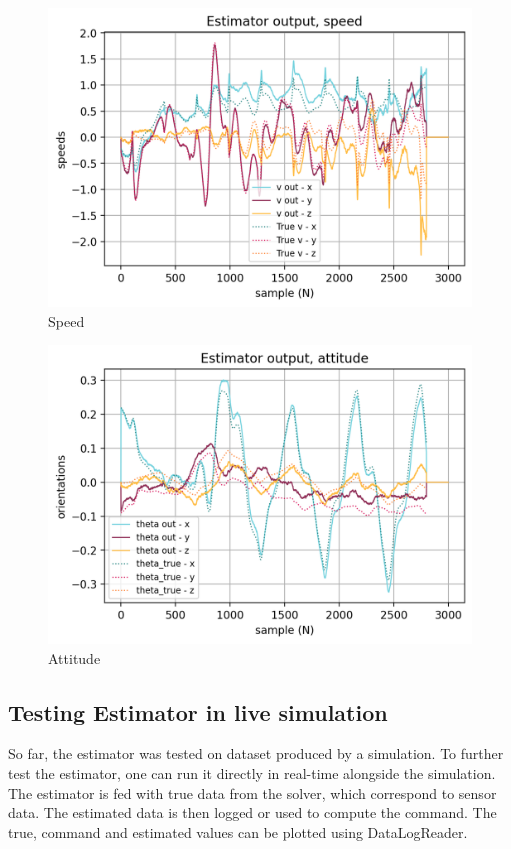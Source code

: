 \documentclass[a4paper,10pt]{article}
\begin{document}
\begin{figure}[H]
\label{fig:estimator_testing_speed}
\centering
  \includegraphics[width=\linewidth, angle=0, scale=0.8]{./images/resultat_simu_speed.png}
  \caption{Speed}
\end{figure}

\begin{figure}[H]
\label{fig:estimator_testing_attitude}
\centering
  \includegraphics[width=\linewidth, angle=0, scale=0.8]{./images/resultat_simu_attitude.png}
  \caption{Attitude}
\end{figure}





\subsection{Testing Estimator in live simulation}
So far, the estimator was tested on dataset produced by a simulation. To further test the estimator, one can run it directly in real-time alongside the simulation. The estimator is fed with true data from the solver, which correspond to sensor data. The estimated data is then logged or used to compute the command. The true, command and estimated values can be plotted using DataLogReader.
\end{document}
